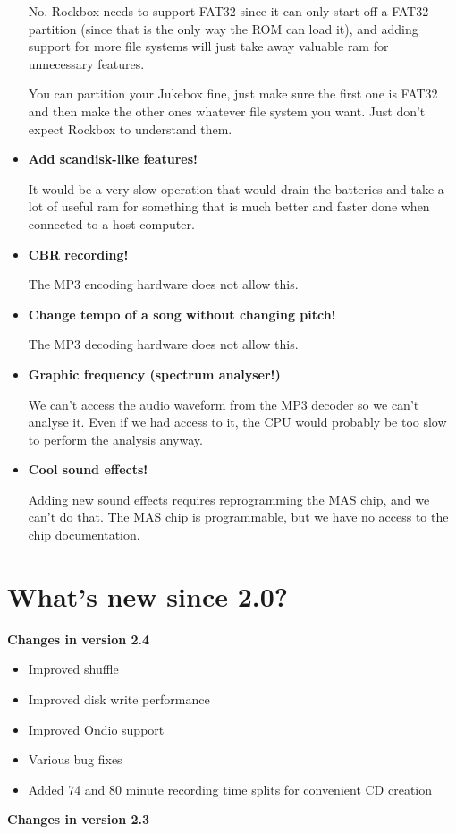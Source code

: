 \begin{itemize}
No. Rockbox needs to support FAT32 since it can only start off a FAT32
partition (since that is the only way the ROM can load it), and adding
support for more file systems will just take away valuable ram for
unnecessary features.

You can partition your Jukebox fine, just make sure the first one is
FAT32 and then make the other ones whatever file system you want. Just
don't expect Rockbox to understand them.
\item {\bfseries
Add scandisk{}-like features!}

It would be a very slow operation that would drain the batteries and
take a lot of useful ram for something that is much better and faster
done when connected to a host computer.
\item {\bfseries
CBR recording!}

The MP3 encoding hardware does not allow this.
\item {\bfseries
Change tempo of a song without changing pitch!}

The MP3 decoding hardware does not allow this.
\end{itemize}
\begin{itemize}
\item {\bfseries
Graphic frequency (spectrum analyser!)}

We can't access the audio waveform from the MP3 decoder
so we can't analyse it. Even if we had access to it, the CPU would probably be too slow to perform the analysis anyway.
\end{itemize}
\begin{itemize}
\item {\bfseries
Cool sound effects!}

Adding new sound effects requires reprogramming the MAS chip, and we
can't do that. The MAS chip is programmable, but we
have no access to the chip documentation.
\end{itemize}



\section{What's new since 2.0?}
{\bfseries
Changes in version 2.4}

\begin{itemize}
\item Improved shuffle
\item Improved disk write performance
\item Improved Ondio support
\item Various bug fixes
\item Added 74 and 80 minute recording time splits for convenient CD
creation
\end{itemize}
{\bfseries
Changes in version 2.3}

